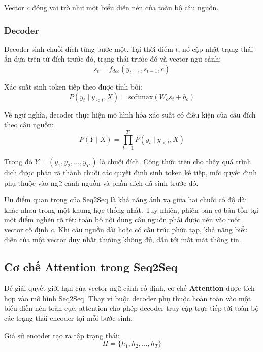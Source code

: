 \documentclass[a4paper,12pt,twoside]{report}
\begin{document}
Vector $c$ đóng vai trò như một biểu diễn nén của toàn bộ câu nguồn.

\subsubsection{Decoder}

Decoder sinh chuỗi đích từng bước một. Tại thời điểm $t$, nó cập nhật trạng thái ẩn dựa trên từ đích trước đó, trạng thái trước đó và vector ngữ cảnh:
\begin{equation}
s_t = f_{dec}(y_{t-1}, s_{t-1}, c)
\end{equation}

Xác suất sinh token tiếp theo được tính bởi:
\begin{equation}
P(y_t \mid y_{<t}, X) = \text{softmax}(W_os_t + b_o)
\end{equation}

Về ngữ nghĩa, decoder thực hiện mô hình hóa xác suất có điều kiện của câu đích theo câu nguồn:
\begin{equation}
P(Y \mid X) = \prod_{t=1}^{T'} P(y_t \mid y_{<t}, X)
\end{equation}

Trong đó $Y = (y_1, y_2, \dots, y_{T'})$ là chuỗi đích. Công thức trên cho thấy quá trình dịch được phân rã thành chuỗi các quyết định sinh token kế tiếp, mỗi quyết định phụ thuộc vào ngữ cảnh nguồn và phần đích đã sinh trước đó.

Ưu điểm quan trọng của Seq2Seq là khả năng ánh xạ giữa hai chuỗi có độ dài khác nhau trong một khung học thống nhất. Tuy nhiên, phiên bản cơ bản tồn tại một điểm nghẽn rõ rệt: toàn bộ nội dung câu nguồn phải được nén vào một vector cố định $c$. Khi câu nguồn dài hoặc có cấu trúc phức tạp, khả năng biểu diễn của một vector duy nhất thường không đủ, dẫn tới mất mát thông tin.

\subsection{Cơ chế Attention trong Seq2Seq}

Để giải quyết giới hạn của vector ngữ cảnh cố định, cơ chế \textbf{Attention} được tích hợp vào mô hình Seq2Seq. Thay vì buộc decoder phụ thuộc hoàn toàn vào một biểu diễn nén toàn cục, attention cho phép decoder truy cập trực tiếp tới toàn bộ các trạng thái encoder tại mỗi bước sinh.

Giả sử encoder tạo ra tập trạng thái:
\begin{equation}
H = \{h_1, h_2, \dots, h_T\}
\end{equation}
\end{document}
